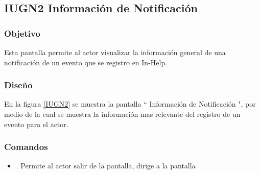\subsection{IUGN2  Información de Notificación}

\subsubsection{Objetivo}

	
    Esta pantalla permite al actor visualizar la información general de una notificación de un evento que se registro en In-Help.

\subsubsection{Diseño}


    En la figura \ref{IUGN2} se muestra la pantalla `` Información de Notificación ", por medio de la cual se muestra la información mas relevante del registro de un evento para el actor.\\


\subsubsection{Comandos}
    \begin{itemize}
    	\item \btnRegresar[Regresar]. Permite al actor salir de la pantalla, dirige a la pantalla 
    \end{itemize}


